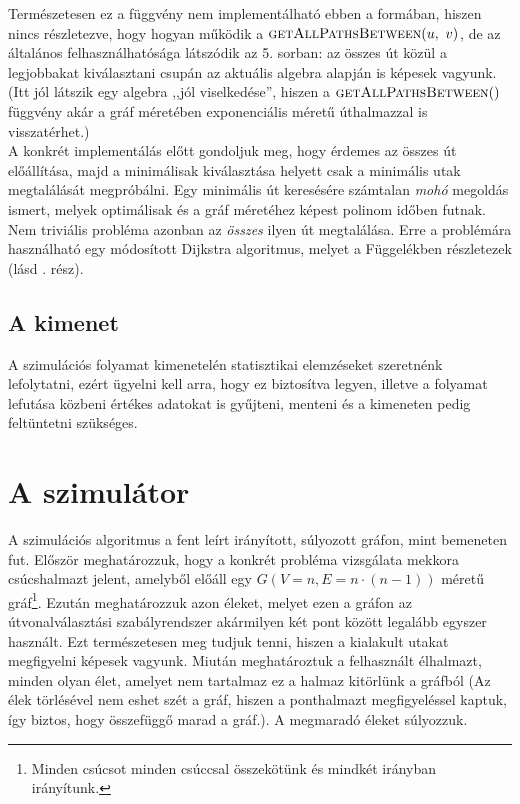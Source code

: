       Természetesen ez a függvény nem implementálható ebben a formában, hiszen nincs részletezve, hogy hogyan működik a $\Call{getAllPathsBetween}{u,~v}$, de az általános felhasználhatósága látszódik az 5. sorban: az összes út közül a legjobbakat kiválasztani csupán az aktuális algebra alapján is képesek vagyunk. (Itt jól látszik egy algebra ,,jól viselkedése'', hiszen a $\Call{getAllPathsBetween}$ függvény akár a gráf méretében exponenciális méretű úthalmazzal is visszatérhet.)\\

      A konkrét implementálás előtt gondoljuk meg, hogy érdemes az összes út előállítása, majd a minimálisak kiválasztása helyett csak a minimális utak megtalálását megpróbálni. Egy minimális út keresésére számtalan \textit{mohó} megoldás ismert, melyek optimálisak és a gráf méretéhez képest polinom időben futnak. Nem triviális probléma azonban az \textit{összes} ilyen út megtalálása. Erre a problémára használható egy módosított Dijkstra algoritmus, melyet a Függelékben részletezek (lásd . rész).

    \subsection{A kimenet}
    A szimulációs folyamat kimenetelén statisztikai elemzéseket szeretnénk lefolytatni, ezért ügyelni kell arra, hogy ez biztosítva legyen, illetve a folyamat lefutása közbeni értékes adatokat is gyűjteni, menteni és a kimeneten pedig feltüntetni szükséges.\newpage

  \section{A szimulátor}\label{section_simulator}
  A szimulációs algoritmus a fent leírt irányított, súlyozott gráfon, mint bemeneten fut. Először meghatározzuk, hogy a konkrét probléma vizsgálata mekkora csúcshalmazt jelent, amelyből előáll egy $G(V=n, E=n \cdot (n-1))$ méretű gráf\footnote{Minden csúcsot minden csúccsal összekötünk és mindkét irányban irányítunk.}. Ezután meghatározzuk azon éleket, melyet ezen a gráfon az útvonalválasztási szabályrendszer akármilyen két pont között legalább egyszer használt. Ezt természetesen meg tudjuk tenni, hiszen a kialakult utakat megfigyelni képesek vagyunk. Miután meghatároztuk a felhasznált élhalmazt, minden olyan élet, amelyet nem tartalmaz ez a halmaz kitörlünk a gráfból (Az élek törlésével nem eshet szét a gráf, hiszen a ponthalmazt megfigyeléssel kaptuk, így biztos, hogy összefüggő marad a gráf.). A megmaradó éleket súlyozzuk.\\

